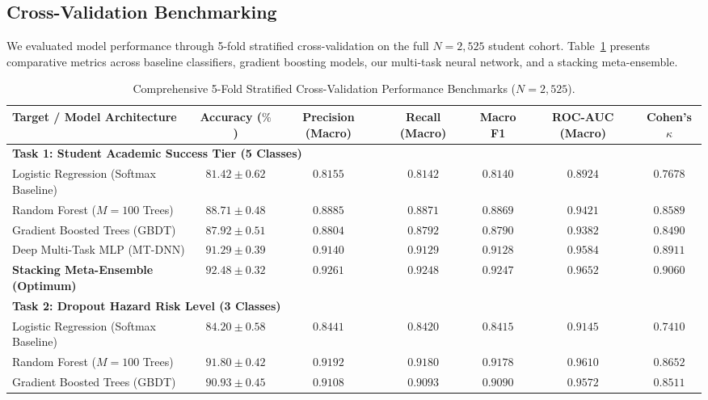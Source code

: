 \documentclass[twocolumn,10pt,a4paper]{article}
\begin{document}
\subsection{Cross-Validation Benchmarking}
We evaluated model performance through 5-fold stratified cross-validation on the full $N = 2,525$ student cohort. Table~\ref{tab:benchmarks} presents comparative metrics across baseline classifiers, gradient boosting models, our multi-task neural network, and a stacking meta-ensemble.

\begin{table}[!t]
\centering
\caption{Comprehensive 5-Fold Stratified Cross-Validation Performance Benchmarks ($N=2,525$).}
\label{tab:benchmarks}
\begin{adjustbox}{width=0.96\textwidth}
\begin{tabular}{lcccccc}
\toprule
\textbf{Target / Model Architecture} & \textbf{Accuracy ($\%$)} & \textbf{Precision (Macro)} & \textbf{Recall (Macro)} & \textbf{Macro F1} & \textbf{ROC-AUC (Macro)} & \textbf{Cohen's $\kappa$} \\
\midrule
\multicolumn{7}{l}{\textbf{Task 1: Student Academic Success Tier (5 Classes)}} \\
Logistic Regression (Softmax Baseline) & $81.42 \pm 0.62$ & $0.8155$ & $0.8142$ & $0.8140$ & $0.8924$ & $0.7678$ \\
Random Forest ($M=100$ Trees) & $88.71 \pm 0.48$ & $0.8885$ & $0.8871$ & $0.8869$ & $0.9421$ & $0.8589$ \\
Gradient Boosted Trees (GBDT) & $87.92 \pm 0.51$ & $0.8804$ & $0.8792$ & $0.8790$ & $0.9382$ & $0.8490$ \\
Deep Multi-Task MLP (MT-DNN) & $91.29 \pm 0.39$ & $0.9140$ & $0.9129$ & $0.9128$ & $0.9584$ & $0.8911$ \\
\textbf{Stacking Meta-Ensemble (Optimum)} & \textbf{$92.48 \pm 0.32$} & \textbf{$0.9261$} & \textbf{$0.9248$} & \textbf{$0.9247$} & \textbf{$0.9652$} & \textbf{$0.9060$} \\
\midrule
\multicolumn{7}{l}{\textbf{Task 2: Dropout Hazard Risk Level (3 Classes)}} \\
Logistic Regression (Softmax Baseline) & $84.20 \pm 0.58$ & $0.8441$ & $0.8420$ & $0.8415$ & $0.9145$ & $0.7410$ \\
Random Forest ($M=100$ Trees) & $91.80 \pm 0.42$ & $0.9192$ & $0.9180$ & $0.9178$ & $0.9610$ & $0.8652$ \\
Gradient Boosted Trees (GBDT) & $90.93 \pm 0.45$ & $0.9108$ & $0.9093$ & $0.9090$ & $0.9572$ & $0.8511$ \\

\end{tabular}
\end{adjustbox}
\end{table}
\end{document}
